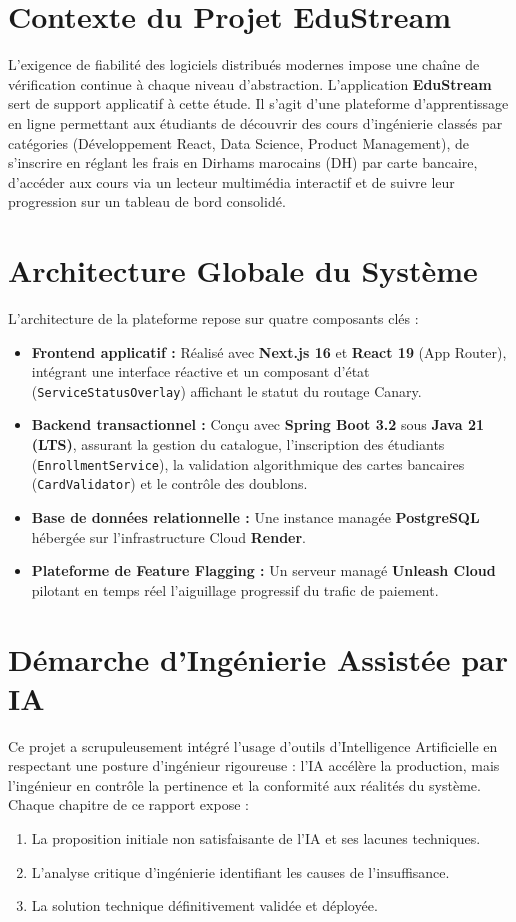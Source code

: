 \documentclass[11pt, a4paper, openany]{report}
\begin{document}
\section{Contexte du Projet EduStream}
L'exigence de fiabilité des logiciels distribués modernes impose une chaîne de vérification continue à chaque niveau d'abstraction. L'application \textbf{EduStream} sert de support applicatif à cette étude. Il s'agit d'une plateforme d'apprentissage en ligne permettant aux étudiants de découvrir des cours d'ingénierie classés par catégories (Développement React, Data Science, Product Management), de s'inscrire en réglant les frais en Dirhams marocains (DH) par carte bancaire, d'accéder aux cours via un lecteur multimédia interactif et de suivre leur progression sur un tableau de bord consolidé.

\section{Architecture Globale du Système}
L'architecture de la plateforme repose sur quatre composants clés :
\begin{itemize}[label=\textbullet, itemsep=2pt]
    \item \textbf{Frontend applicatif :} Réalisé avec \textbf{Next.js 16} et \textbf{React 19} (App Router), intégrant une interface réactive et un composant d'état (\texttt{ServiceStatusOverlay}) affichant le statut du routage Canary.
    \item \textbf{Backend transactionnel :} Conçu avec \textbf{Spring Boot 3.2} sous \textbf{Java 21 (LTS)}, assurant la gestion du catalogue, l'inscription des étudiants (\texttt{EnrollmentService}), la validation algorithmique des cartes bancaires (\texttt{CardValidator}) et le contrôle des doublons.
    \item \textbf{Base de données relationnelle :} Une instance managée \textbf{PostgreSQL} hébergée sur l'infrastructure Cloud \textbf{Render}.
    \item \textbf{Plateforme de Feature Flagging :} Un serveur managé \textbf{Unleash Cloud} pilotant en temps réel l'aiguillage progressif du trafic de paiement.
\end{itemize}

\section{Démarche d'Ingénierie Assistée par IA}
Ce projet a scrupuleusement intégré l'usage d'outils d'Intelligence Artificielle en respectant une posture d'ingénieur rigoureuse : l'IA accélère la production, mais l'ingénieur en contrôle la pertinence et la conformité aux réalités du système. Chaque chapitre de ce rapport expose :
\begin{enumerate}[noitemsep]
    \item La proposition initiale non satisfaisante de l'IA et ses lacunes techniques.
    \item L'analyse critique d'ingénierie identifiant les causes de l'insuffisance.
    \item La solution technique définitivement validée et déployée.
\end{enumerate}
\end{document}
